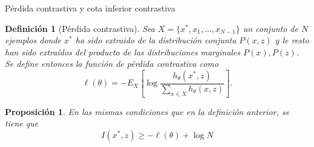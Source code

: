 \documentclass[aspectratio=169]{beamer}
\newtheorem{defi}{Definición}
\newtheorem{prop}{Proposición}
\begin{document}
  
  \begin{frame}{Pérdida contrastiva y cota inferior contrastiva}
    
    \begin{defi}[Pérdida contrastiva]
      Sea \(X =\{x^*,x_1,\dots,x_{N-1}\}\) un conjunto de \(N\) ejemplos donde $x^*$ ha sido extraido de la distribución conjunta \(P(x,z)\) y le resto han sido extraídos del producto de las distribuciones marginales \(P(x),P(z)\). Se define entonces la función de pérdida contrastiva como  
      \[ 
        \ell(\theta) = - E_X \left[ \log \frac{h_\theta(x^*,z)}{\sum_{x \in X}h_\theta(x,z)}\right]. 
        \]
    \end{defi}

    \begin{prop}
      En las mismas condiciones que en la definición anterior, se tiene que
      \[
        I(x^*,z) \geq -  \ell(\theta) + \log N
      \]
    \end{prop}
  
  \end{frame}
  
\end{document}
